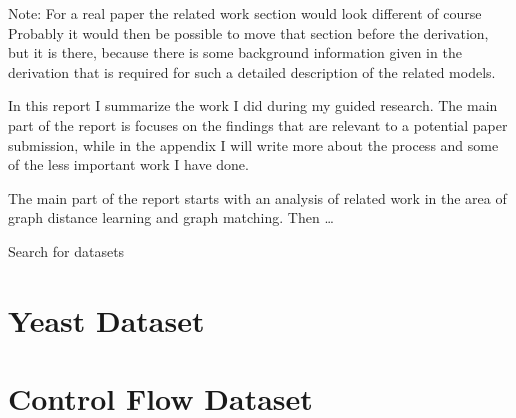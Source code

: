 \appendix
\appendixpage

Note: For a real paper the related work section would look different of course
Probably it would then be possible to move that section before the derivation, but it is there, because there is some background information given in the derivation that is required for such a detailed description of the related models.

In this report I summarize the work I did during my guided research. The main part of the report is focuses on the findings that are relevant to a potential paper submission, while in the appendix I will write more about the process and some of the less important work I have done.

The main part of the report starts with an analysis of related work in the area of graph distance learning and graph matching. Then \dots


Search for datasets

\section{Yeast Dataset}

\section{Control Flow Dataset}
